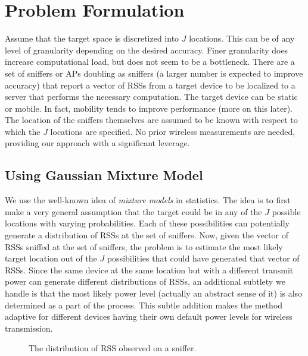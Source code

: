 
\section{Problem Formulation}
\label{sec:problemformulation}

Assume that the target space is discretized into $J$ locations. 
This can be of any level of granularity 
depending on the desired accuracy. Finer granularity does increase computational load, but does not seem to be a bottleneck. There are a set of sniffers or APs doubling as sniffers (a larger number is expected to improve accuracy) that report a vector of RSSs from a target device to be localized to a server that performs the necessary computation. The target device can be static or mobile. In fact, mobility tends to improve performance (more on this later). The location of the sniffers themselves are assumed to be known with respect to which the $J$ locations
are specified. No prior wireless measurements are needed, providing our approach with a significant leverage. 

\subsection{Using Gaussian Mixture Model}
We use the well-known idea of {\em mixture models} in statistics. The idea is to first make a very general assumption that the target could be in any of the $J$ possible locations with varying probabilities. Each of these possibilities can potentially generate a distribution of RSSs
at the set of sniffers. Now, given the vector of RSSs sniffed at the set of sniffers, the problem is to estimate the most likely target 
location out of the $J$ possibilities that could have generated that vector of RSSs. Since 
the same device at the same location but with a different transmit power can generate different distributions of RSSs, an additional subtlety we handle is that the
most likely power level (actually an abstract sense of it) is also
determined as a part of the process. This subtle addition makes the
method adaptive for different devices having their own default power
levels for wireless transmission.

\begin{figure} 
\centering
{} 
\caption{The distribution of RSS observed on a sniffer.}
\label{fig:distribution}
\end{figure}


